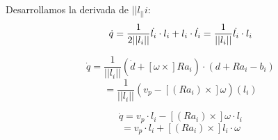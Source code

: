 Desarrollamos la derivada de $||l_||i$:
\begin{equation}
\dot{q} = \frac{1}{2||l_i||} \dot{l_i} \cdot l_i + l_i \cdot \dot{l_i} = \frac{1}{||l_i||} \dot{l_i} \cdot l_i \\ \bigskip
\end{equation}

\begin{equation}
\dot{q}=\frac{1}{||l_i||}(\dot{d} + [\omega \times] Ra_i)\cdot(d + Ra_i -b_i) 
\end{equation}
\begin{equation*}
= \frac{1}{||l_i||}(v_p - [(Ra_i)\times]\omega)(l_i)
\end{equation*}

\begin{equation}
\dot{q} = v_p \cdot l_i - [(Ra_i)\times]\omega \cdot l_i 
\end{equation}
\begin{equation*}
= v_p \cdot l_i + [(Ra_i)\times]l_i \cdot \omega
\end{equation*}

